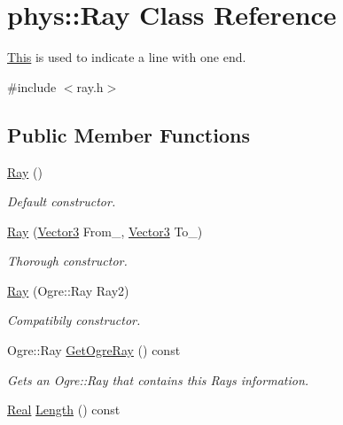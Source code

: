 \hypertarget{classphys_1_1Ray}{
\section{phys::Ray Class Reference}
\label{df/d57/classphys_1_1Ray}
}


\hyperlink{structThis}{This} is used to indicate a line with one end.  




{\ttfamily \#include $<$ray.h$>$}

\subsection*{Public Member Functions}
\begin{DoxyCompactItemize}
\item 
\hyperlink{classphys_1_1Ray_a35f4f5eec653ea561353163eaad672d3}{Ray} ()
\begin{DoxyCompactList}\small\item\em Default constructor. \item\end{DoxyCompactList}\item 
\hyperlink{classphys_1_1Ray_aa6123ef37a2351e6cca3954c23212379}{Ray} (\hyperlink{classphys_1_1Vector3}{Vector3} From\_\-, \hyperlink{classphys_1_1Vector3}{Vector3} To\_\-)
\begin{DoxyCompactList}\small\item\em Thorough constructor. \item\end{DoxyCompactList}\item 
\hyperlink{classphys_1_1Ray_a395485ffe19e6a53966730c01a2781c1}{Ray} (Ogre::Ray Ray2)
\begin{DoxyCompactList}\small\item\em Compatibily constructor. \item\end{DoxyCompactList}\item 
Ogre::Ray \hyperlink{classphys_1_1Ray_a0c29b1a55f42ff60d224f16cc0910cdb}{GetOgreRay} () const 
\begin{DoxyCompactList}\small\item\em Gets an Ogre::Ray that contains this Rays information. \item\end{DoxyCompactList}\item 
\hyperlink{namespacephys_af7eb897198d265b8e868f45240230d5f}{Real} \hyperlink{classphys_1_1Ray_add544025fcd6d1cdcfed3c0413b3701b}{Length} () const 

\end{DoxyCompactItemize}
